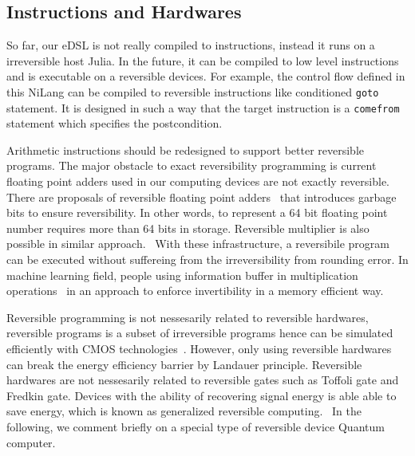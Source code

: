 \documentclass[aps,twocolumn,longbibliography,english,superscriptaddress,prr]{revtex4-1}
\newcommand{\<}{\langle}
\renewcommand{\>}{\rangle}
\theoremstyle{definition}\newtheorem{definition}{\textit{Definition}}
\begin{document}
\subsection{Instructions and Hardwares}\label{sec:instruction}
So far, our eDSL is not really compiled to instructions, instead it runs on a irreversible host Julia.
In the future, it can be compiled to low level instructions and is executable on a reversible devices.
For example, the control flow defined in this NiLang can be compiled to reversible instructions like conditioned \texttt{goto} statement.
It is designed in such a way that the target instruction is a \texttt{comefrom} statement which specifies the postcondition. ~\cite{Vieri1999}

Arithmetic instructions should be redesigned to support better reversible programs.
The major obstacle to exact reversibility programming is current floating point adders used in our computing devices are not exactly reversible.
There are proposals of reversible floating point adders~\cite{Nachtigal2011,Nguyen2013} that introduces garbage bits to ensure reversibility.
In other words, to represent a 64 bit floating point number requires more than 64 bits in storage. Reversible multiplier is also possible in similar approach.~\cite{Nachtigal2010} With these infrastructure, a reversibile program can be executed without suffereing from the irreversibility from rounding error.
In machine learning field, people using information buffer in multiplication operations~\cite{Maclaurin2015} in an approach to enforce invertibility in a memory efficient way.

Reversible programming is not nessesarily related to reversible hardwares, reversible programs is a subset of irreversible programs hence can be simulated efficiently with CMOS technologies~\cite{Vieri1999}. However, only using reversible hardwares~\cite{} can break the energy efficiency barrier by Landauer principle.
Reversible hardwares are not nessesarily related to reversible gates such as Toffoli gate and Fredkin gate.
Devices with the ability of recovering signal energy is able able to save energy, which is known as generalized reversible computing.~\cite{Frank2005,Frank2017b}
In the following, we comment briefly on a special type of reversible device Quantum computer.
\end{document}
